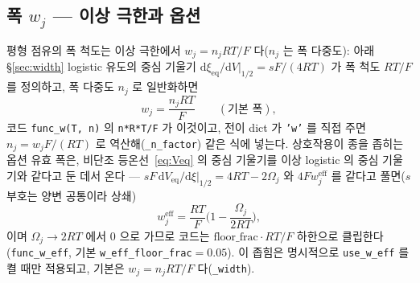 \documentclass[11pt,a4paper]{article}
\newcommand{\dd}{\mathrm{d}}
\newcommand{\eff}{\mathrm{eff}}
\newcommand{\eq}{\mathrm{eq}}
\newcommand{\code}[1]{\texttt{#1}}
\begin{document}
\subsection{폭 $w_j$ — 이상 극한과 옵션}
평형 점유의 폭 척도는 이상 극한에서 $w_j=n_jRT/F$ 다($n_j$ 는 폭 다중도): 아래 \S\ref{sec:width} logistic 유도의
중심 기울기 $\dd\xi_\eq/\dd V|_{1/2}=sF/(4RT)$ 가 폭 척도 $RT/F$ 를 정의하고, 폭 다중도 $n_j$ 로 일반화하면
\begin{equation}
w_j=\frac{n_jRT}{F}\qquad(\text{기본 폭}),
\label{eq:wbase}
\end{equation}
코드 \code{func\_w(T, n)} 의 \code{n*R*T/F}
가 이것이고, 전이 dict 가 \code{'w'} 를 직접 주면 $n_j=w_jF/(RT)$ 로 역산해(\code{\_n\_factor}) 같은 식에 넣는다.
상호작용이 종을 좁히는 옵션 유효 폭은, 비단조 등온선~\eqref{eq:Veq} 의 중심 기울기를 이상 logistic 의 중심 기울기와
같다고 둔 데서 온다 — $sF\,\dd V_\eq/\dd\xi|_{1/2}=4RT-2\Omega_j$ 와 $4Fw^\eff_j$ 를 같다고 풀면($s$ 부호는 양변 공통이라 상쇄)
\begin{equation}
w_j^\eff=\frac{RT}{F}\Big(1-\frac{\Omega_j}{2RT}\Big),
\label{eq:weff}
\end{equation}
이며 $\Omega_j\to2RT$ 에서 $0$ 으로 가므로 코드는 $\mathrm{floor\_frac}\cdot RT/F$ 하한으로 클립한다(\code{func\_w\_eff},
기본 \code{w\_eff\_floor\_frac}$=0.05$). 이 좁힘은 명시적으로 \code{use\_w\_eff} 를 켤 때만 적용되고, 기본은
$w_j=n_jRT/F$ 다(\code{\_width}).
\end{document}
